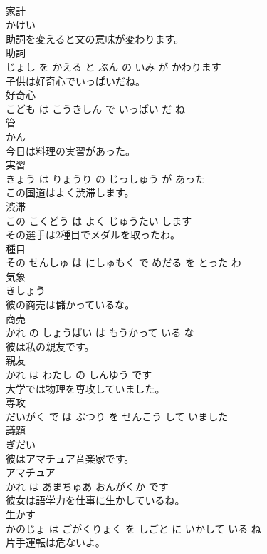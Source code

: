 \documentclass[8pt]{extreport}
\begin{document}
\begin{CJK}{UTF8}{min}
\\	家計	
\\	かけい			
\\	助詞を変えると文の意味が変わります。	
\\	助詞 
\\	じょし を かえる と ぶん の いみ が かわります			
\\	子供は好奇心でいっぱいだね。	
\\	好奇心 
\\	こども は こうきしん で いっぱい だ ね			
\\	管	
\\	かん			
\\	今日は料理の実習があった。	
\\	実習 
\\	きょう は りょうり の じっしゅう が あった			
\\	この国道はよく渋滞します。	
\\	渋滞 
\\	この こくどう は よく じゅうたい します			
\\	その選手は2種目でメダルを取ったわ。	
\\	種目 
\\	その せんしゅ は にしゅもく で めだる を とった わ			
\\	気象	
\\	きしょう			
\\	彼の商売は儲かっているな。	
\\	商売 
\\	かれ の しょうばい は もうかって いる な			
\\	彼は私の親友です。	
\\	親友 
\\	かれ は わたし の しんゆう です			
\\	大学では物理を専攻していました。	
\\	専攻 
\\	だいがく で は ぶつり を せんこう して いました			
\\	議題	
\\	ぎだい			
\\	彼はアマチュア音楽家です。	
\\	アマチュア 
\\	かれ は あまちゅあ おんがくか です			
\\	彼女は語学力を仕事に生かしているね。	
\\	生かす 
\\	かのじょ は ごがくりょく を しごと に いかして いる ね			
\\	片手運転は危ないよ。	

\end{CJK}
\end{document}
